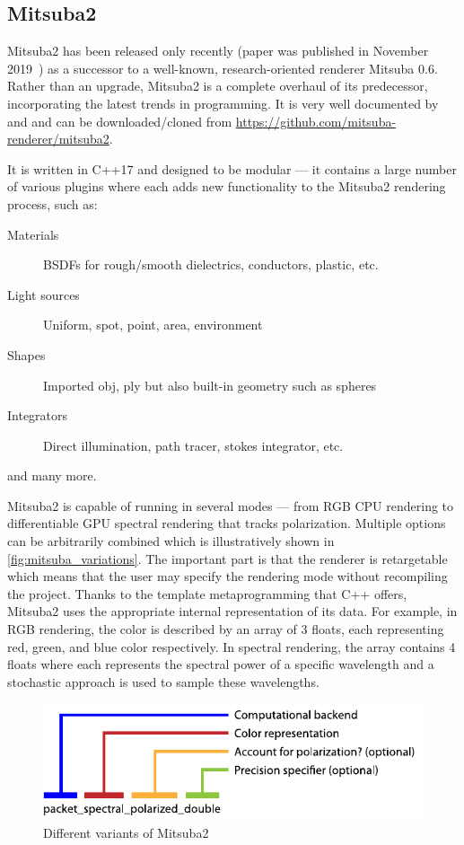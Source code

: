 \subsection{Mitsuba2}

Mitsuba2 has been released only recently (paper was published in November 2019~\cite{nimier2019mitsuba}) as a successor to a well-known, research-oriented renderer Mitsuba 0.6. Rather than an upgrade, Mitsuba2 is a complete overhaul of its predecessor, incorporating the latest trends in programming. It is very well documented by \citet{mitsubaWeb} and \citet{nimier2019mitsuba} and can be downloaded/cloned from \url{https://github.com/mitsuba-renderer/mitsuba2}.

It is written in C++17 and designed to be modular --- it contains a large number of various plugins where each adds new functionality to the Mitsuba2 rendering process, such as:

\begin{description}
	\item[Materials] BSDFs for rough/smooth dielectrics, conductors, plastic, etc.
	\item[Light sources] Uniform, spot, point, area, environment
	\item[Shapes] Imported obj, ply but also built-in geometry such as spheres
	\item[Integrators] Direct illumination, path tracer, stokes integrator, etc.
\end{description}

and many more.

Mitsuba2 is capable of running in several modes --- from RGB CPU rendering to differentiable GPU spectral rendering that tracks polarization. Multiple options can be arbitrarily combined which is illustratively shown in \autoref{fig:mitsuba_variations}. The important part is that the renderer is retargetable which means that the user may specify the rendering mode without recompiling the project. Thanks to the template metaprogramming that C++ offers, Mitsuba2 uses the appropriate internal representation of its data. For example, in RGB rendering, the color is described by an array of 3 floats, each representing red, green, and blue color respectively. In spectral rendering, the array contains 4 floats where each represents the spectral power of a specific wavelength and a stochastic approach is used to sample these wavelengths.

\begin{figure}
	\centering
	\includegraphics[width=0.8\linewidth]{img/mitsuba_variants.pdf}
	\caption{Different variants of Mitsuba2}
	\label{fig:mitsuba_variations}
\end{figure}

